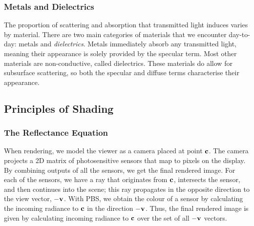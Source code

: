 \subsubsection{Metals and Dielectrics}

The proportion of scattering and absorption that transmitted light induces varies by material. There are two main categories of materials that we encounter day-to-day: metals and \textit{dielectrics}. Metals immediately absorb any transmitted light, meaning their appearance is solely provided by the specular term. Most other materials are non-conductive, called dielectrics. These materials do allow for subsurface scattering, so both the specular and diffuse terms characterise their appearance.

\subsection{Principles of Shading} \label{PrinciplesOfShading}

\subsubsection{The Reflectance Equation}

When rendering, we model the viewer as a camera placed at point \begin{math}\mathbf{c}\end{math}. The camera projects a 2D matrix of photosensitive sensors that map to pixels on the display. By combining outputs of all the sensors, we get the final rendered image. For each of the sensors, we have a ray that originates from \begin{math}\mathbf{c}\end{math}, intersects the sensor, and then continues into the scene; this ray propagates in the opposite direction to the view vector, \begin{math}\mathbf{-v}\end{math}. With PBS, we obtain the colour of a sensor by calculating the incoming radiance to \begin{math}\mathbf{c}\end{math} in the direction \begin{math}\mathbf{-v}\end{math}. Thus, the final rendered image is given by calculating incoming radiance to \begin{math}\mathbf{c}\end{math} over the set of all \begin{math}\mathbf{-v}\end{math} vectors.

